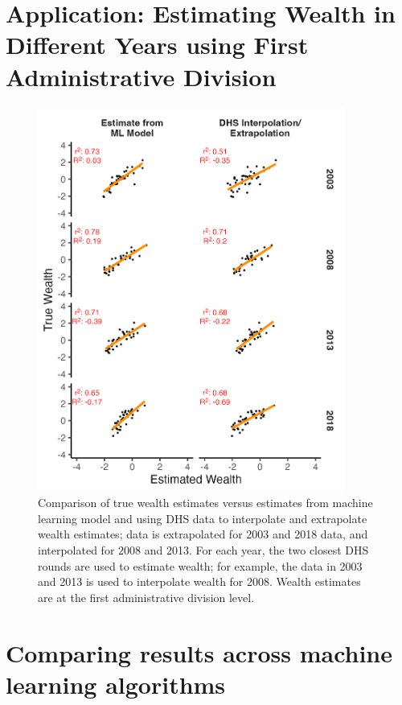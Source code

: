\documentclass{article}
\begin{document}
\newpage
\section{Application: Estimating Wealth in Different Years using First Administrative Division}
\label{si:policy_exp_nigeria_gadm_1}

\begin{figure}[H]
    \centering
    \includegraphics[width=0.9\textwidth]{figures/policy_exp_nigeria_gadm_1.png}
    \caption{Comparison of true wealth estimates versus estimates from machine learning model and using DHS data to interpolate and extrapolate wealth estimates; data is extrapolated for 2003 and 2018 data, and interpolated for 2008 and 2013. For each year, the two closest DHS rounds are used to estimate wealth; for example, the data in 2003 and 2013 is used to interpolate wealth for 2008. Wealth estimates are at the first administrative division level.}
     \label{fig:policy_exp_nigeria_gadm_1}
\end{figure}

\newpage
\section{Comparing results across machine learning algorithms}
\label{si:ml_results_type}
\end{document}
